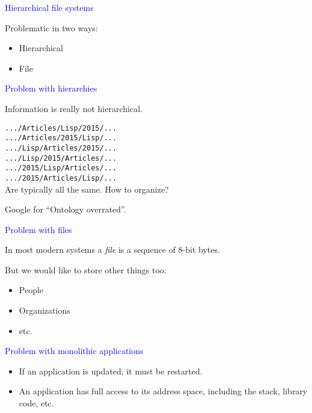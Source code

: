 \documentclass{slides}
\newcommand{\ti}[1]{\begin{center}\Large{\textcolor{blue}{#1}}\end{center}}
\begin{document}
\begin{slide}\ti{Hierarchical file systems}
\vskip 0.5cm
Problematic in two ways:

\begin{itemize}
\item Hierarchical
\item File
\end{itemize}

\vfill\end{slide}
\begin{slide}\ti{Problem with hierarchies}
\vskip 0.5cm
Information is really not hierarchical. 

\texttt{.../Articles/Lisp/2015/...}\\
\texttt{.../Articles/2015/Lisp/...}\\
\texttt{.../Lisp/Articles/2015/...}\\
\texttt{.../Lisp/2015/Articles/...}\\
\texttt{.../2015/Lisp/Articles/...}\\
\texttt{.../2015/Articles/Lisp/...}\\

Are typically all the same.  How to organize?

Google for ``Ontology overrated''.

\vfill\end{slide}
\begin{slide}\ti{Problem with files}
\vskip 0.5cm
In most modern systems a \emph{file} is a sequence of 8-bit bytes.

But we would like to store other things too:

\begin{itemize}
\item People
\item Organizations
\item etc.
\end{itemize}

\vfill\end{slide}
\begin{slide}\ti{Problem with monolithic applications}

  \begin{itemize}
  \item If an application is updated, it must be restarted.
  \item An application has full access to its address space, including
    the stack, library code, etc.
  \end{itemize}

\vfill\end{slide}
\end{document}
